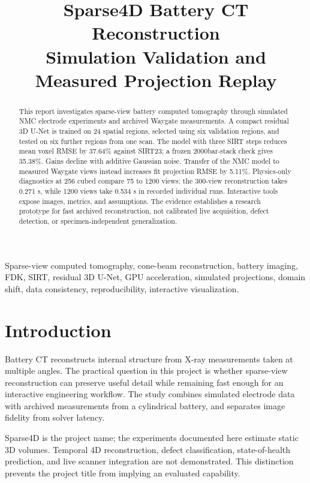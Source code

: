 \documentclass[conference,a4paper]{IEEEtran}
\title{Sparse4D Battery CT Reconstruction\\Simulation Validation and Measured Projection Replay}
\author{\IEEEauthorblockN{Amikula Pavan Kumar Goud}
\IEEEauthorblockA{MSc Computer Science Student\\Blekinge Institute of Technology\\Karlskrona, Sweden}}
\begin{document}
\maketitle


\begin{abstract}

This report investigates sparse-view battery computed tomography through simulated NMC electrode experiments and archived Waygate measurements. A compact residual 3D U-Net is trained on 24 spatial regions, selected using six validation regions, and tested on six further regions from one scan. The model with three SIRT steps reduces mean voxel RMSE by 37.64\% against SIRT23; a frozen 2000bar-stack check gives 35.38\%. Gains decline with additive Gaussian noise. Transfer of the NMC model to measured Waygate views instead increases fit projection RMSE by 5.11\%. Physics-only diagnostics at 256 cubed compare 75 to 1200 views: the 300-view reconstruction takes 0.271 s, while 1200 views take 0.534 s in recorded individual runs. Interactive tools expose images, metrics, and assumptions. The evidence establishes a research prototype for fast archived reconstruction, not calibrated live acquisition, defect detection, or specimen-independent generalization.

\end{abstract}

\begin{IEEEkeywords}

Sparse-view computed tomography, cone-beam reconstruction, battery imaging, FDK, SIRT, residual 3D U-Net, GPU acceleration, simulated projections, domain shift, data consistency, reproducibility, interactive visualization.

\end{IEEEkeywords}

\section{Introduction}

Battery CT reconstructs internal structure from X-ray measurements taken at multiple angles. The practical question in this project is whether sparse-view reconstruction can preserve useful detail while remaining fast enough for an interactive engineering workflow. The study combines simulated electrode data with archived measurements from a cylindrical battery, and separates image fidelity from solver latency.

Sparse4D is the project name; the experiments documented here estimate static 3D volumes. Temporal 4D reconstruction, defect classification, state-of-health prediction, and live scanner integration are not demonstrated. This distinction prevents the project title from implying an evaluated capability.
\end{document}
